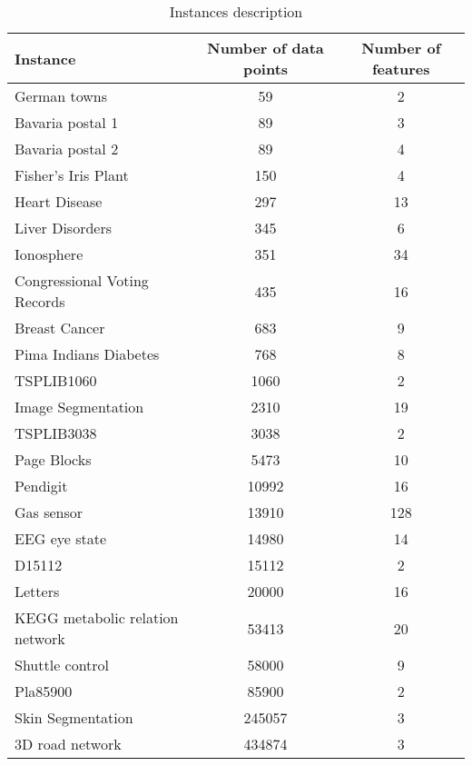 \begin{table}[]
\centering
\begin{tabular}{@{}lcc@{}}
\toprule
Instance                        & Number of data points & Number of features \\ \midrule
German towns                    & 59                    & 2                  \\
Bavaria postal 1                & 89                    & 3                  \\
Bavaria postal 2                & 89                    & 4                  \\
Fisher’s Iris Plant             & 150                   & 4                  \\
Heart Disease                   & 297                   & 13                 \\
Liver Disorders                 & 345                   & 6                  \\
Ionosphere                      & 351                   & 34                 \\
Congressional Voting Records    & 435                   & 16                 \\
Breast Cancer                   & 683                   & 9                  \\
Pima Indians Diabetes           & 768                   & 8                  \\
TSPLIB1060                      & 1060                  & 2                  \\
Image Segmentation              & 2310                  & 19                 \\
TSPLIB3038                      & 3038                  & 2                  \\
Page Blocks                     & 5473                  & 10                 \\
Pendigit                        & 10992                 & 16                 \\
Gas sensor                      & 13910                 & 128                \\
EEG eye state                   & 14980                 & 14                 \\
D15112                          & 15112                 & 2                  \\
Letters                         & 20000                 & 16                 \\
KEGG metabolic relation network & 53413                 & 20                 \\
Shuttle control                 & 58000                 & 9                  \\
Pla85900                        & 85900                 & 2                  \\
Skin Segmentation               & 245057                & 3                  \\
3D road network                 & 434874                & 3                  \\ \bottomrule
\end{tabular}
\caption{Instances description}
\label{instances}
\end{table}